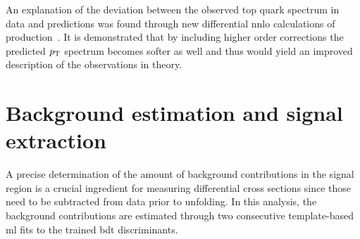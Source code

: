 
An explanation of the deviation between the observed top quark \pt spectrum in data and predictions was found through new differential \gls{nnlo} calculations of \ttbar production~\cite{Czakon:2015owf}. It is demonstrated that by including higher order corrections the predicted $p_\mathrm{T}$ spectrum becomes softer as well and thus would yield an improved description of the observations in theory.


\clearpage

\section{Background estimation and signal extraction}
\label{sec:polarization-fit}

A precise determination of the amount of background contributions in the signal region is a crucial ingredient for measuring differential cross sections since those need to be subtracted from data prior to unfolding. In this analysis, the background contributions are estimated through two consecutive template-based \gls{ml} fits to the trained \gls{bdt} discriminants.

